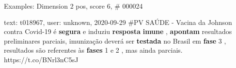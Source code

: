 \begin{frame}{Examples: Dimension 2 pos, score 6, \# 000024}
\footnotesize
\begin{exampleblock}{text: t018967, user: unknown, 2020-09-29}
\#PV SAÚDE - Vacina da Johnson contra Covid-19 é \textbf{segura} e induziu 
\textbf{resposta} \textbf{imune} , \textbf{apontam} resultados preliminares 
parciais, imunização deverá ser \textbf{testada} no Brasil em \textbf{fase} 3 , 
resultados são referentes às \textbf{fases} 1 e 2 , mas ainda parciais. 
https://t.co/BNrl3nC5sJ 
\end{exampleblock}
\end{frame}
